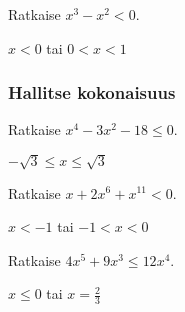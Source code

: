 \begin{tehtava}
    Ratkaise $x^3-x^2<0$.
    \begin{vastaus}
    $x<0$ tai $0<x<1$
    \end{vastaus}
\end{tehtava}



\subsubsection*{Hallitse kokonaisuus}




\begin{tehtava}
    Ratkaise $x^4-3x^2-18 \le 0$.
    \begin{vastaus}
    $-\sqrt{3}\le x \le \sqrt{3}$
    \end{vastaus}
\end{tehtava}

\begin{tehtava}
    Ratkaise $x+2x^6+x^{11}<0$.
    \begin{vastaus}
    $x<-1$ tai $ -1<x<0$
    \end{vastaus}
\end{tehtava}

\begin{tehtava}
    Ratkaise $4 x^5+9 x^3 \le 12 x^4$.
    \begin{vastaus}
    $x\le0$ tai $x=\frac{2}{3}$
    \end{vastaus}
\end{tehtava}